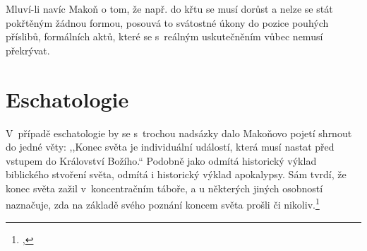 Mluví-li navíc Makoň o tom, že např. do křtu se musí dorůst a nelze se stát
pokřtěným žádnou formou, posouvá to svátostné úkony do pozice pouhých příslibů,
formálních aktů, které se s~reálným uskutečněním vůbec nemusí překrývat.

\section{Eschatologie}

V~případě eschatologie by se s~trochou nadsázky dalo Makoňovo pojetí shrnout do
jedné věty: ,,Konec světa je individuální událostí, která musí nastat před vstupem
do Království Božího.`` Podobně jako odmítá historický výklad biblického stvoření
světa, odmítá i historický výklad apokalypsy. Sám tvrdí, že konec světa zažil
v~koncentračním táboře, a u některých jiných osobností naznačuje, zda na základě
svého poznání koncem světa prošli či nikoliv.\footnote{,
}

